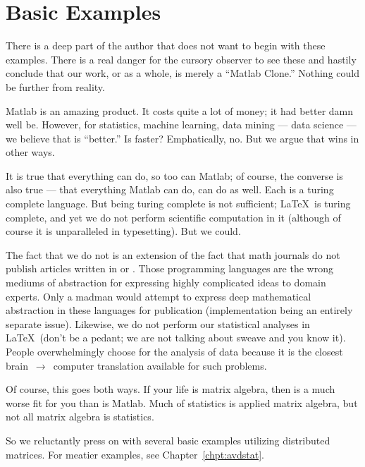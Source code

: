 


\chapter{Basic Examples}

There is a deep part of the author that does not want to begin with these examples.  There is a real danger for the cursory observer to see these and hastily conclude that our work, or  as a whole, is merely a ``Matlab Clone.''  Nothing could be further from reality.

Matlab is an amazing product.  It costs quite a lot of money; it had better damn well be.  However, for statistics, machine learning, data mining --- data science --- we believe that  is ``better.''  Is  faster?  Emphatically, no.  But we argue that  wins in other ways.

It is true that everything  can do, so too can Matlab; of course, the converse is also true --- that everything Matlab can do,  can do as well.  Each is a turing complete language.  But being turing complete is not sufficient; \LaTeX\ is turing complete, and yet we do not perform scientific computation in it (although of course it is unparalleled in typesetting).  But we could.  

The fact that we do not is an extension of the fact that math journals do not publish articles written in  or .  Those programming languages are the wrong mediums of abstraction for expressing highly complicated ideas to domain experts.  Only a madman would attempt to express deep mathematical abstraction in these languages for publication (implementation being an entirely separate issue).  Likewise, we do not perform our statistical analyses in \LaTeX\ (don't be a pedant; we are not talking about sweave and you know it).  People overwhelmingly choose  for the analysis of data because it is the closest brain~$\rightarrow$~computer translation available for such problems.

Of course, this goes both ways.  If your life is matrix algebra, then  is a much worse fit for you than is Matlab.  Much of statistics is applied matrix algebra, but not all matrix algebra is statistics.

So we reluctantly press on with several basic examples utilizing distributed matrices.  For meatier examples, see Chapter~\ref{chpt:avdstat}.




